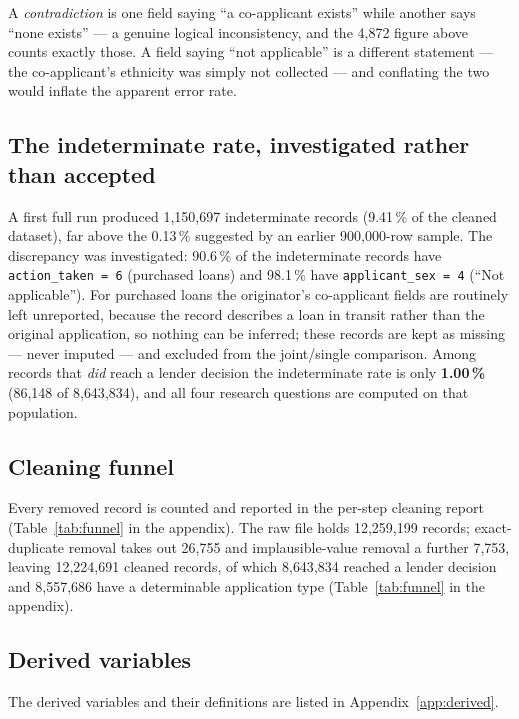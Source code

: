 \documentclass[sigconf,balance=false]{acmart}
\begin{document}
A \emph{contradiction} is one field saying ``a co-applicant exists'' while
another says ``none exists'' --- a genuine logical inconsistency, and the
4{,}872 figure above counts exactly those. A field saying ``not applicable''
is a different statement --- the co-applicant's ethnicity was simply not
collected --- and conflating the two would inflate the apparent error
rate.

\subsection{The indeterminate rate, investigated rather than accepted}

A first full run produced 1{,}150{,}697 indeterminate records (9.41\,\% of
the cleaned dataset), far above the 0.13\,\% suggested by an earlier
900{,}000-row sample. The discrepancy was investigated: 90.6\,\% of the
indeterminate records have \texttt{action\_\allowbreak taken = 6} (purchased
loans) and 98.1\,\% have \texttt{applicant\_\allowbreak sex = 4} (``Not
applicable''). For purchased loans the originator's co-applicant fields are
routinely left unreported, because the record describes a loan in transit
rather than the original application, so nothing can be inferred; these
records are kept as missing --- never imputed --- and excluded from the
joint/single comparison. Among records that \emph{did} reach a lender
decision the indeterminate rate is only \textbf{1.00\,\%} (86{,}148 of
8{,}643{,}834), and all four research questions are computed on that
population.

\subsection{Cleaning funnel}

Every removed record is counted and reported in the per-step cleaning
report (Table~\ref{tab:funnel} in the appendix). The raw
file holds 12{,}259{,}199 records; exact-duplicate removal takes out
26{,}755 and implausible-value removal a further 7{,}753, leaving
12{,}224{,}691 cleaned records, of which 8{,}643{,}834 reached a lender
decision and 8{,}557{,}686 have a determinable application type
(Table~\ref{tab:funnel} in the appendix).

\subsection{Derived variables}

The derived variables and their definitions are listed in
Appendix~\ref{app:derived}.
\end{document}
